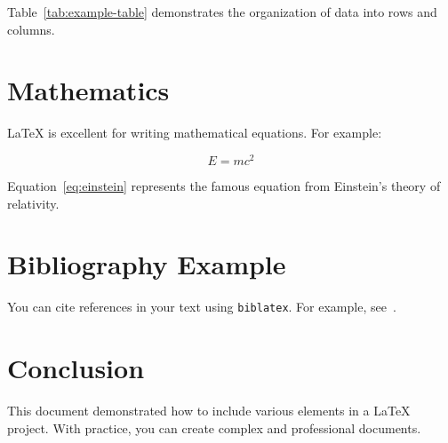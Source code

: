 \documentclass[a4paper,12pt]{article}
\begin{document}
Table~\ref{tab:example-table} demonstrates the organization of data into rows and columns.

\section{Mathematics}
LaTeX is excellent for writing mathematical equations. For example:

\begin{equation}
    E = mc^2
    \label{eq:einstein}
\end{equation}

Equation~\ref{eq:einstein} represents the famous equation from Einstein's theory of relativity.

\section{Bibliography Example}
You can cite references in your text using \texttt{biblatex}. For example, see~\cite{knuth1984tex}.

\section{Conclusion}
This document demonstrated how to include various elements in a LaTeX project. With practice, you can create complex and professional documents.

\newpage
\printbibliography
\end{document}
